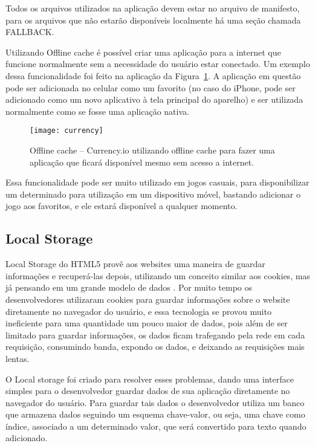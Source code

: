 Todos os arquivos utilizados na aplicação devem estar no arquivo de
manifesto, para os arquivos que não estarão disponíveis localmente há
uma seção chamada FALLBACK.

Utilizando Offline cache é possível criar uma aplicação para a
internet que funcione normalmente sem a necessidade do usuário estar
conectado. Um exemplo dessa funcionalidade foi feito na aplicação da
Figura~\ref{img:currency}. A aplicação em questão pode ser adicionada
no celular como um favorito (no caso do iPhone, pode ser adicionado
como um novo aplicativo à tela principal do aparelho) e ser utilizada
normalmente como se fosse uma aplicação nativa.

\begin{figure}[H]
  \centering
	\texttt{[image: currency]}
  \caption{Offline cache {--} Currency.io utilizando offline cache
  para fazer uma aplicação que ficará disponível mesmo sem acesso a
  internet.}
  \label{img:currency}
\end{figure}

Essa funcionalidade pode ser muito utilizado em jogos casuais, para disponibilizar um
determinado para utilização em um dispositivo móvel, bastando
adicionar o jogo aos favoritos, e ele estará disponível a qualquer
momento.


\subsection{Local Storage}

Local Storage do HTML5 provê aos websites uma maneira de guardar
informações e recuperá-las depois, utilizando um conceito similar aos
cookies, mas já pensando em um grande modelo de dados \cite{pilgrim2010html5}.
Por muito tempo os desenvolvedores utilizaram cookies para guardar
informações sobre o website diretamente no navegador do usuário, e
essa tecnologia se provou muito ineficiente para uma quantidade um
pouco maior de dados, pois além de ser limitado para guardar informações,
os dados ficam trafegando pela rede em cada requisição, consumindo
banda, expondo os dados, e deixando as requisições mais lentas.

O Local storage foi criado para resolver esses problemas, dando uma
interface simples para o desenvolvedor guardar dados de sua
aplicação diretamente no navegador do usuário. Para guardar tais dados
o desenvolvedor utiliza um banco que armazena dados seguindo um
esquema chave-valor, ou seja, uma chave como índice, associado a um
determinado valor, que será convertido para texto quando adicionado.

